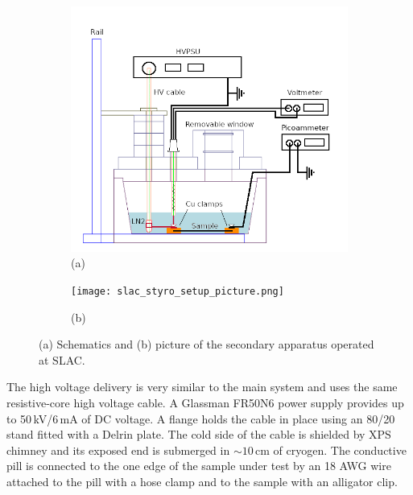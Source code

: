 \documentclass[a4paper,12pt]{article}
\begin{document}
\begin{figure}[htb]
    \centering
    \begin{subfigure}[c]{0.49\linewidth}
    \begin{center}
    \includegraphics[width=\linewidth]{slac_styro_setup.png}
    (a)
    \end{center}
    \end{subfigure}
    \begin{subfigure}[c]{0.49\linewidth}
    \begin{center}
    \vspace*{1em}
    
    \texttt{[image: slac\_styro\_setup\_picture.png]}
    \vspace*{0.5em}
    
    (b)
    \end{center}
    \end{subfigure}
    \caption{(a) Schematics and (b) picture of the secondary apparatus operated at SLAC.}
    \label{fig:slac_styro_setup}
\end{figure}

The high voltage delivery is very similar to the main system and uses the same resistive-core high voltage cable. A Glassman FR50N6 power supply provides up to 50\,kV/6\,mA of DC voltage.  A flange holds the cable in place using an 80/20 stand fitted with a Delrin plate. The cold side of the cable is shielded by XPS chimney and its exposed end is submerged in $\sim10$\,cm of cryogen. The conductive pill is connected to the one edge of the sample under test by an 18 AWG wire attached to the pill with a hose clamp and to the sample with an alligator clip.
\end{document}
